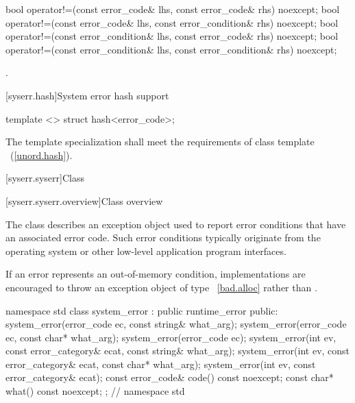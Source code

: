 %
%
%
%
\begin{itemdecl}
bool operator!=(const error_code& lhs, const error_code& rhs) noexcept;
bool operator!=(const error_code& lhs, const error_condition& rhs) noexcept;
bool operator!=(const error_condition& lhs, const error_code& rhs) noexcept;
bool operator!=(const error_condition& lhs, const error_condition& rhs) noexcept;
\end{itemdecl}

\begin{itemdescr}
\pnum
\returns {}.
\end{itemdescr}

[syserr.hash]{System error hash support}

%
\begin{itemdecl}
template <> struct hash<error_code>;
\end{itemdecl}

\begin{itemdescr}
\pnum The template specialization shall meet the requirements of class template
~(\ref{unord.hash}).
\end{itemdescr}

[syserr.syserr]{Class }

[syserr.syserr.overview]{Class  overview}

\pnum
The class  describes an exception object used to
report error conditions that have an associated error code. Such error
conditions typically originate from the operating system or other low-level
application program interfaces.

\pnum
\begin{note} If an error represents an out-of-memory condition, implementations are
encouraged to throw an exception object of type ~\ref{bad.alloc} rather
than . \end{note}

%
\begin{codeblock}
namespace std {
  class system_error : public runtime_error {
  public:
    system_error(error_code ec, const string& what_arg);
    system_error(error_code ec, const char* what_arg);
    system_error(error_code ec);
    system_error(int ev, const error_category& ecat,
        const string& what_arg);
    system_error(int ev, const error_category& ecat,
        const char* what_arg);
    system_error(int ev, const error_category& ecat);
    const error_code& code() const noexcept;
    const char* what() const noexcept;
  };
}   // namespace std
\end{codeblock}

